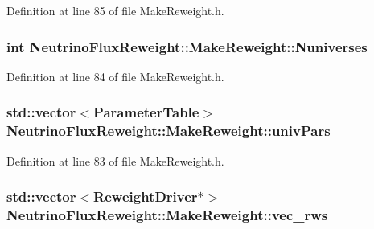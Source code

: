 Definition at line 85 of file Make\-Reweight.\-h.

\hypertarget{class_neutrino_flux_reweight_1_1_make_reweight_a172e839a27e6c89dbaf9cb493c99bbef}{
\subsubsection[{Nuniverses}]{\setlength{\rightskip}{0pt plus 5cm}int Neutrino\-Flux\-Reweight\-::\-Make\-Reweight\-::\-Nuniverses\hspace{0.3cm}{\ttfamily [private]}}}\label{class_neutrino_flux_reweight_1_1_make_reweight_a172e839a27e6c89dbaf9cb493c99bbef}


Definition at line 84 of file Make\-Reweight.\-h.

\hypertarget{class_neutrino_flux_reweight_1_1_make_reweight_a3c94d871d61417aeb2c86c21af485582}{
\subsubsection[{univ\-Pars}]{\setlength{\rightskip}{0pt plus 5cm}std\-::vector$<${\bf Parameter\-Table}$>$ Neutrino\-Flux\-Reweight\-::\-Make\-Reweight\-::univ\-Pars\hspace{0.3cm}{\ttfamily [private]}}}\label{class_neutrino_flux_reweight_1_1_make_reweight_a3c94d871d61417aeb2c86c21af485582}


Definition at line 83 of file Make\-Reweight.\-h.

\hypertarget{class_neutrino_flux_reweight_1_1_make_reweight_a5110b72da0e87323e3f38703a48e7f3f}{
\subsubsection[{vec\-\_\-rws}]{\setlength{\rightskip}{0pt plus 5cm}std\-::vector$<${\bf Reweight\-Driver}$\ast$$>$ Neutrino\-Flux\-Reweight\-::\-Make\-Reweight\-::vec\-\_\-rws}}\label{class_neutrino_flux_reweight_1_1_make_reweight_a5110b72da0e87323e3f38703a48e7f3f}


